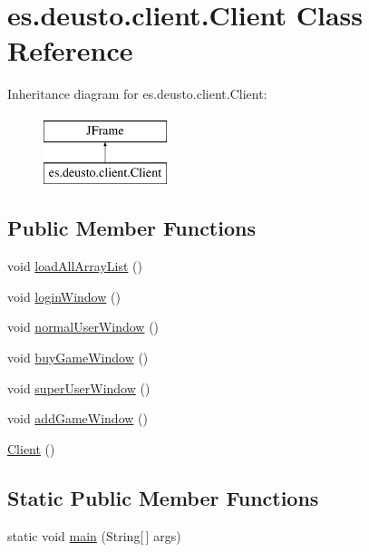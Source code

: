 \hypertarget{classes_1_1deusto_1_1client_1_1_client}{}\section{es.\+deusto.\+client.\+Client Class Reference}
\label{classes_1_1deusto_1_1client_1_1_client}
Inheritance diagram for es.\+deusto.\+client.\+Client\+:\begin{figure}[H]
\begin{center}
\leavevmode
\includegraphics[height=2.000000cm]{classes_1_1deusto_1_1client_1_1_client}
\end{center}
\end{figure}
\subsection*{Public Member Functions}
\begin{DoxyCompactItemize}
\item 
void \hyperlink{classes_1_1deusto_1_1client_1_1_client_a3c027247b46e10a82a88fac316a6e635}{load\+All\+Array\+List} ()
\item 
void \hyperlink{classes_1_1deusto_1_1client_1_1_client_a99ce82d21b7f81f9b476e5482c17ddbd}{login\+Window} ()
\item 
void \hyperlink{classes_1_1deusto_1_1client_1_1_client_a688abbdfb95fda7b15a736a72deaae60}{normal\+User\+Window} ()
\item 
void \hyperlink{classes_1_1deusto_1_1client_1_1_client_ae67b3ab9fcbb2d8717ac91548c4ceef3}{buy\+Game\+Window} ()
\item 
void \hyperlink{classes_1_1deusto_1_1client_1_1_client_aaa87f75ccecaa826adef54464cceaf62}{super\+User\+Window} ()
\item 
void \hyperlink{classes_1_1deusto_1_1client_1_1_client_ac331cfb4a526be39d17a9d43136dc153}{add\+Game\+Window} ()
\item 
\hyperlink{classes_1_1deusto_1_1client_1_1_client_a71c03e318a72447da873297f3364f67f}{Client} ()
\end{DoxyCompactItemize}
\subsection*{Static Public Member Functions}
\begin{DoxyCompactItemize}
\item 
static void \hyperlink{classes_1_1deusto_1_1client_1_1_client_a69a7526d0af9cb2341f4bf341b501152}{main} (String\mbox{[}$\,$\mbox{]} args)
\end{DoxyCompactItemize}


